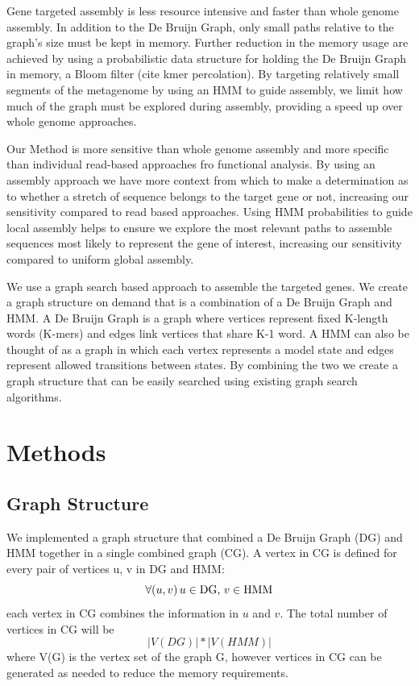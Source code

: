 \documentclass{article}
\begin{document}
Gene targeted assembly is less resource intensive and faster than whole genome assembly.  In addition to the De Bruijn Graph, only small paths relative to the graph's size must be kept in memory.  Further reduction in the memory usage are achieved by using a probabilistic data structure for holding the De Bruijn Graph in memory, a Bloom filter \cite{Bloom1970} (cite kmer percolation).  By targeting relatively small segments of the metagenome by using an HMM to guide assembly, we limit how much of the graph must be explored during assembly, providing a speed up over whole genome approaches.

Our Method is more sensitive than whole genome assembly and more specific than individual read-based approaches fro functional analysis.  By using an assembly approach we have more context from which to make a determination as to whether a stretch of sequence belongs to the target gene or not, increasing our sensitivity compared to read based approaches.  Using HMM probabilities to guide local assembly helps to ensure we explore the most relevant paths to assemble sequences most likely to represent the gene of interest, increasing our sensitivity compared to uniform global assembly.

We use a graph search based approach to assemble the targeted genes.  We create a graph structure on demand that is a combination of a De Bruijn Graph and HMM.  A De Bruijn Graph is a graph where vertices represent fixed K-length words (K-mers) and edges link vertices that share K-1 word.  A HMM can also be thought of as a graph in which each vertex represents a model state and edges represent allowed transitions between states.  By combining the two we create a graph structure that can be easily searched using existing graph search algorithms.
\section{Methods}
\subsection{Graph Structure}
We implemented a graph structure that combined a De Bruijn Graph (DG) and HMM together in a single combined graph (CG).  A vertex in CG is defined for every pair of vertices u, v in DG and HMM:
\[ \forall (u,v)\, u\in \textnormal{DG, }v\in \textnormal{HMM} \] each vertex in CG combines the information in $u$ and $v$.
The total number of vertices in CG will be \[|V(DG)| * |V(HMM)|\] where V(G) is the vertex set of the graph G, however vertices in CG can be generated as needed to reduce the memory requirements.
\end{document}
